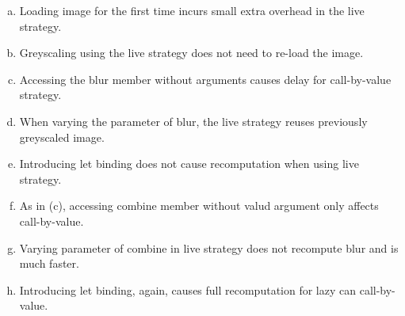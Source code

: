 \documentclass[acmsmall,anonymous,fleqn]{acmart}\settopmatter{printfolios=false,printccs=false,printacmref=false}
\theoremstyle{plain}
\theoremstyle{definition}
\begin{document}
\begin{enumerate}[(a)]
\item Loading image for the first time incurs small extra overhead in the live strategy.
\item Greyscaling using the live strategy does not need to re-load the image.
\item Accessing the blur member without arguments causes delay for call-by-value strategy.
\item When varying the parameter of blur, the live strategy reuses previously greyscaled image.
\item Introducing let binding does not cause recomputation when using live strategy.
\item As in (c), accessing combine member without valud argument only affects call-by-value.
\item Varying parameter of combine in live strategy does not recompute blur and is much faster.
\item Introducing let binding, again, causes full recomputation for lazy can call-by-value.
\end{enumerate}

\end{document}

